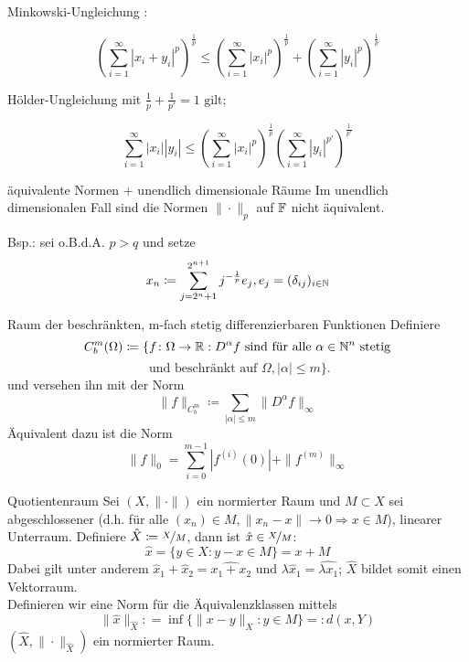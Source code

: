	\begin{karte}{Minkowski-Ungleichung}
			: 
			
			\[ \left( \sum_{i=1}^{\infty} |x_{i} + y_{i}|^p\right)^{\frac{1}{p}} \leq\left( \sum_{i=1}^{\infty} |x_{i}|^p\right)^{\frac{1}{p}} + \left( \sum_{i=1}^{\infty} |y_{i}|^p\right)^{\frac{1}{p}} \]
	\end{karte}
	
	\begin{karte}{Hölder-Ungleichung}
		 mit $\frac{1}{p} + \frac{1}{p'} = 1 \text{ gilt; }$
		 
		 \[ \sum_{i=1}^{\infty} |x_{i}| |y_{i}| \leq \left( \sum_{i=1}^{\infty} |x_{i}|^{p} \right)^{\frac{1}{p}} \left( \sum_{i=1}^{\infty} |y_{i}|^{p'} \right)^{\frac{1}{p'}} \]	
	\end{karte}
	
	\begin{karte}{äquivalente Normen + unendlich dimensionale Räume}
		Im unendlich dimensionalen Fall sind die Normen $\| \cdot \|_{p}$ auf $\mathbb{F}$ nicht äquivalent.
		
		Bsp.: sei o.B.d.A. $p > q$ und setze 
		\[ x_{n} \coloneqq \sum_{j = 2^{n} + 1}^{2^{n + 1}} j^{-\frac{1}{p}}e_{j}, e_{j} = ( \delta_{ij} )_{i \in \mathbb{N}} \]
	\end{karte}
	
	\begin{karte}{Raum der beschränkten, m-fach stetig differenzierbaren Funktionen}	
	Definiere
		\[ C_{b}^{m}(\Omega) \coloneqq \{ f \colon \Omega \rightarrow \mathbb{R} : D^{\alpha}f \text{ sind für alle } \alpha \in \mathbb{N}^{n} \text{ stetig} \] \[ \text{ und beschränkt auf } \Omega, |\alpha| \leq m \}. \]	
		und versehen ihn mit der Norm 
			\[ \| f \|_{C_{b}^{m}} \coloneqq \sum_{|\alpha| \leq m} \| D^{\alpha}f \|_{\infty} \]
		Äquivalent dazu ist die Norm
		\[ \| f \|_{0} = \sum_{i = 0}^{m - 1} |f^{(i)}(0)| + \| f^{(m)} \|_{\infty} \]
	\end{karte}
	
	\begin{karte}{Quotientenraum}		
	Sei $(X, \| \cdot \|)$ ein normierter Raum und $M \subset X$ sei abgeschlossener (d.h. für alle $(x_{n}) \in M, \| x_{n} - x \| \rightarrow 0 \Rightarrow x \in M$), linearer Unterraum.
	Definiere $\hat X \coloneqq \nicefrac{X}{M}$, dann ist $\hat x \in \nicefrac{X}{M}$:
		\[ \hat x = \{ y \in X: y - x \in M \} = x + M \]
	Dabei gilt unter anderem $\hat x_{1} + \hat x_{2} = \widehat{x_{1} + x_{2}}$ und $\lambda \hat x_{1} = \widehat{\lambda x_{1}}$; $\hat X$ bildet somit einen Vektorraum. \\
	Definieren wir eine Norm für die Äquivalenzklassen mittels
		\[ \| \hat x \|_{\hat X} : = \inf \{ \| x - y \|_{X}: y \in M \} =: d(x, Y) \]
	$(\hat X, \| \cdot \|_{\hat X})$ ein normierter Raum.
	\end{karte}